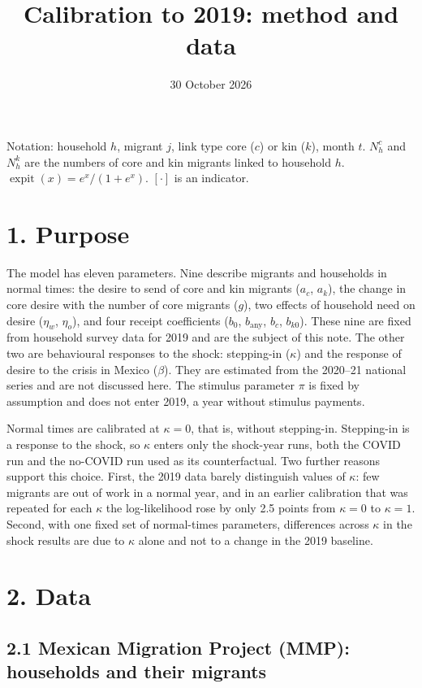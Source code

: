 \documentclass[11pt]{article}
\title{Calibration to 2019: method and data}
\author{}
\date{30 October 2026}
\newcommand{\expit}{\operatorname{expit}}
\begin{document}
\maketitle

\noindent Notation: household $h$, migrant $j$, link type core ($c$) or kin ($k$), month $t$. $N^c_h$ and $N^k_h$ are the numbers of core and kin migrants linked to household $h$. $\expit(x) = e^x/(1+e^x)$. $[\cdot]$ is an indicator.

\section*{1. Purpose}

The model has eleven parameters. Nine describe migrants and households in normal times: the desire to send of core and kin migrants ($a_c$, $a_k$), the change in core desire with the number of core migrants ($g$), two effects of household need on desire ($\eta_w$, $\eta_o$), and four receipt coefficients ($b_0$, $b_{\text{any}}$, $b_c$, $b_{k0}$). These nine are fixed from household survey data for 2019 and are the subject of this note. The other two are behavioural responses to the shock: stepping-in ($\kappa$) and the response of desire to the crisis in Mexico ($\beta$). They are estimated from the 2020--21 national series and are not discussed here. The stimulus parameter $\pi$ is fixed by assumption and does not enter 2019, a year without stimulus payments.

Normal times are calibrated at $\kappa = 0$, that is, without stepping-in. Stepping-in is a response to the shock, so $\kappa$ enters only the shock-year runs, both the COVID run and the no-COVID run used as its counterfactual. Two further reasons support this choice. First, the 2019 data barely distinguish values of $\kappa$: few migrants are out of work in a normal year, and in an earlier calibration that was repeated for each $\kappa$ the log-likelihood rose by only 2.5 points from $\kappa = 0$ to $\kappa = 1$. Second, with one fixed set of normal-times parameters, differences across $\kappa$ in the shock results are due to $\kappa$ alone and not to a change in the 2019 baseline.

\section*{2. Data}

\subsection*{2.1 Mexican Migration Project (MMP): households and their migrants}
\end{document}
